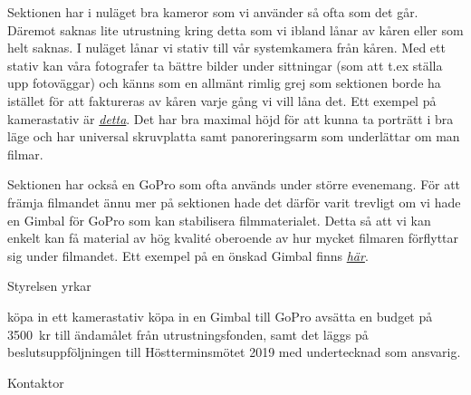 \documentclass[../_main/handlingar.tex]{subfiles}
\begin{document}


Sektionen har i nuläget bra kameror som vi använder så ofta som det går. Däremot saknas lite utrustning kring detta som vi ibland lånar av kåren eller som helt saknas. 
I nuläget lånar vi stativ till vår systemkamera från kåren. Med ett stativ kan våra fotografer ta bättre bilder under sittningar (som att t.ex ställa upp fotoväggar) 
och känns som en allmänt rimlig grej som sektionen borde ha istället för att faktureras av kåren varje gång vi vill låna det. Ett exempel på kamerastativ är \href{https://www.elgiganten.se/product/foto-video/tillbehor-systemkamera/VELBONS200/velbon-sherpa-200-stativ}{\textit{detta}}. 
Det har bra maximal höjd för att kunna ta porträtt i bra läge och har universal skruvplatta samt panoreringsarm som underlättar om man filmar.

Sektionen har också en GoPro som ofta används under större evenemang. För att främja filmandet ännu mer på sektionen hade det därför varit trevligt om vi hade en Gimbal för GoPro som kan stabilisera filmmaterialet. 
Detta så att vi kan enkelt kan få material av hög kvalité oberoende av hur mycket filmaren förflyttar sig under filmandet. Ett exempel på en önskad Gimbal finns \href{https://www.dustinhome.se/product/5011088351/g6-splash-proof-gimbal}{\textit{här}}.

Styrelsen yrkar

\begin{attsatser}
\att köpa in ett kamerastativ
\att köpa in en Gimbal till GoPro
\att avsätta en budget på \SI{3500}{kr} till ändamålet från utrustningsfonden, samt
\att det läggs på beslutsuppföljningen till Höstterminsmötet 2019 med undertecknad som ansvarig.

\end{attsatser}

\begin{signatures}{1}
    \ist
    \signature{\sekr}{Kontaktor}
\end{signatures}
\end{document}
